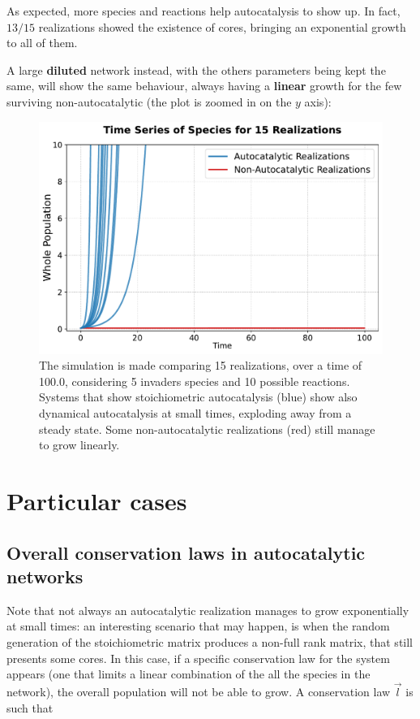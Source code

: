 \documentclass{article}
\begin{document}
As expected, more species and reactions help autocatalysis to show up. In fact, $13/15$ realizations showed the existence of cores, bringing an exponential growth to all of them.

A large \textbf{diluted} network instead, with the others parameters being kept the same, will show the same behaviour, always having a \textbf{linear} growth for the few surviving non-autocatalytic (the plot is zoomed in on the $y$ axis):

\begin{figure}[H]
    \centering
    \includegraphics[width=0.6\linewidth]{traj_large_elegant_dil.pdf}
       \caption{\small{The simulation is made comparing 15 realizations, over a time of 100.0, considering 5 invaders species and 10 possible reactions. Systems that show stoichiometric autocatalysis (blue) show also dynamical autocatalysis at small times, exploding away from a steady state. Some non-autocatalytic realizations (red) still manage to grow linearly. }}
    \label{Fig. 7}
\end{figure}

\section{Particular cases}

\subsection{Overall conservation laws in autocatalytic networks}

Note that not always an autocatalytic realization manages to grow exponentially at small times: an interesting scenario that may happen, is when the random generation of the stoichiometric matrix produces a non-full rank matrix, that still presents some cores. In this case, if a specific conservation law for the system appears (one that limits a linear combination of the all the species in the network), the overall population will not be able to grow. A conservation law $\Vec{l}$ is such that
\end{document}
